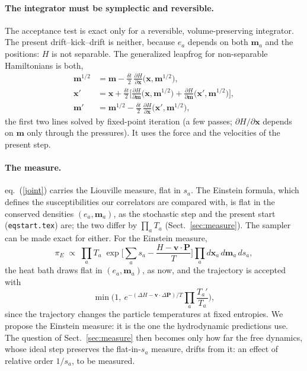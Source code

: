 \documentclass[11pt,aps,preprint,nofootinbib,superscriptaddress,tightenlines]{revtex4-2}
\def\st{\begin{equation}}
\def\stp{\end{equation}}
\def\Eq#1{eq.~(\ref{#1})}
\def\Sect#1{Sect.~\ref{#1}}
\let\oldparagraph\paragraph
\renewcommand{\paragraph}{\par\bigskip\oldparagraph}
\begin{document}
\paragraph{The integrator must be symplectic and reversible.}  The acceptance test is exact only for a reversible,
volume-preserving integrator.  The present drift--kick--drift is neither, because $e_a$ depends on both $\bm m_a$ and the
positions: $H$ is not separable.  The generalized leapfrog for non-separable Hamiltonians is both,
\st
\begin{aligned}
\bm m^{1/2}&=\bm m-\tfrac{\delta t}2\,\frac{\partial H}{\partial\bm x}\big(\bm x,\bm m^{1/2}\big),\\
\bm x'&=\bm x+\tfrac{\delta t}2\Big[\frac{\partial H}{\partial\bm m}\big(\bm x,\bm m^{1/2}\big)+\frac{\partial H}{\partial\bm m}\big(\bm x',\bm m^{1/2}\big)\Big],\\
\bm m'&=\bm m^{1/2}-\tfrac{\delta t}2\,\frac{\partial H}{\partial\bm x}\big(\bm x',\bm m^{1/2}\big),
\end{aligned}
\stp
the first two lines solved by fixed-point iteration (a few passes; $\partial H/\partial\bm x$ depends on $\bm m$ only through the
pressures).  It uses the force and the velocities of the present step.

\paragraph{The measure.}  \Eq{joint} carries the Liouville measure, flat in $s_a$.  The Einstein formula, which defines
the susceptibilities our correlators are compared with, is flat in the conserved densities $(e_a,\bm m_a)$, as the
stochastic step and the present start (\texttt{eqstart.tex}) are; the two differ by $\prod_aT_a$ (\Sect{sec:measure}).  The
sampler can be made exact for either.  For the Einstein measure,
\st
\pi_E\;\propto\;\prod_aT_a\;\exp\Big[\sum_as_a-\frac{H-\bm v\cdot\bm P}{T}\Big]\prod_ad\bm x_a\,d\bm m_a\,ds_a ,
\stp
the heat bath draws flat in $(e_a,\bm m_a)$, as now, and the trajectory is accepted with
\st
\min\Big(1,\ e^{-(\Delta H-\bm v\cdot\Delta\bm P)/T}\prod_a\frac{T_a'}{T_a}\Big) ,
\stp
since the trajectory changes the particle temperatures at fixed entropies.  We propose the Einstein measure: it is the one
the hydrodynamic predictions use.  The question of \Sect{sec:measure} then becomes only how far the free dynamics, whose
ideal step preserves the flat-in-$s_a$ measure, drifts from it: an effect of relative order $1/s_a$, to be measured.
\end{document}
